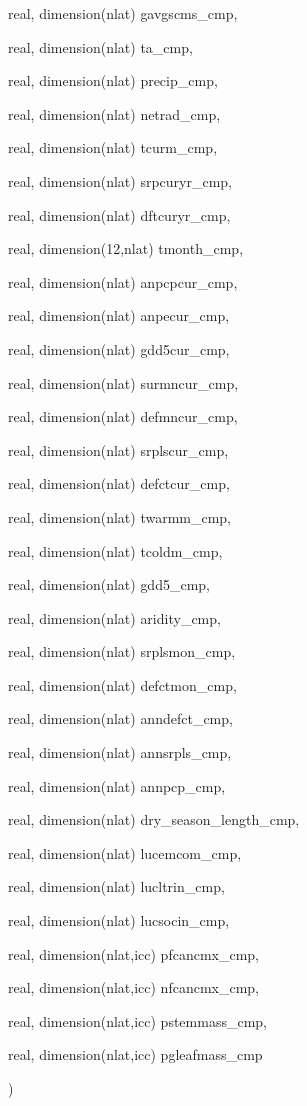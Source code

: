 {\begin{DoxyParamCaption}
\item[{real, dimension(nlat)}]{gavgscms\+\_\+cmp, }
\item[{real, dimension(nlat)}]{ta\+\_\+cmp, }
\item[{real, dimension(nlat)}]{precip\+\_\+cmp, }
\item[{real, dimension(nlat)}]{netrad\+\_\+cmp, }
\item[{real, dimension(nlat)}]{tcurm\+\_\+cmp, }
\item[{real, dimension(nlat)}]{srpcuryr\+\_\+cmp, }
\item[{real, dimension(nlat)}]{dftcuryr\+\_\+cmp, }
\item[{real, dimension(12,nlat)}]{tmonth\+\_\+cmp, }
\item[{real, dimension(nlat)}]{anpcpcur\+\_\+cmp, }
\item[{real, dimension(nlat)}]{anpecur\+\_\+cmp, }
\item[{real, dimension(nlat)}]{gdd5cur\+\_\+cmp, }
\item[{real, dimension(nlat)}]{surmncur\+\_\+cmp, }
\item[{real, dimension(nlat)}]{defmncur\+\_\+cmp, }
\item[{real, dimension(nlat)}]{srplscur\+\_\+cmp, }
\item[{real, dimension(nlat)}]{defctcur\+\_\+cmp, }
\item[{real, dimension(nlat)}]{twarmm\+\_\+cmp, }
\item[{real, dimension(nlat)}]{tcoldm\+\_\+cmp, }
\item[{real, dimension(nlat)}]{gdd5\+\_\+cmp, }
\item[{real, dimension(nlat)}]{aridity\+\_\+cmp, }
\item[{real, dimension(nlat)}]{srplsmon\+\_\+cmp, }
\item[{real, dimension(nlat)}]{defctmon\+\_\+cmp, }
\item[{real, dimension(nlat)}]{anndefct\+\_\+cmp, }
\item[{real, dimension(nlat)}]{annsrpls\+\_\+cmp, }
\item[{real, dimension(nlat)}]{annpcp\+\_\+cmp, }
\item[{real, dimension(nlat)}]{dry\+\_\+season\+\_\+length\+\_\+cmp, }
\item[{real, dimension(nlat)}]{lucemcom\+\_\+cmp, }
\item[{real, dimension(nlat)}]{lucltrin\+\_\+cmp, }
\item[{real, dimension(nlat)}]{lucsocin\+\_\+cmp, }
\item[{real, dimension(nlat,icc)}]{pfcancmx\+\_\+cmp, }
\item[{real, dimension(nlat,icc)}]{nfcancmx\+\_\+cmp, }
\item[{real, dimension(nlat,icc)}]{pstemmass\+\_\+cmp, }
\item[{real, dimension(nlat,icc)}]{pgleafmass\+\_\+cmp}
\end{DoxyParamCaption}
)}\label{competition__unmap_8f_ab970a794d878e125da563f7022d2d3a4}

